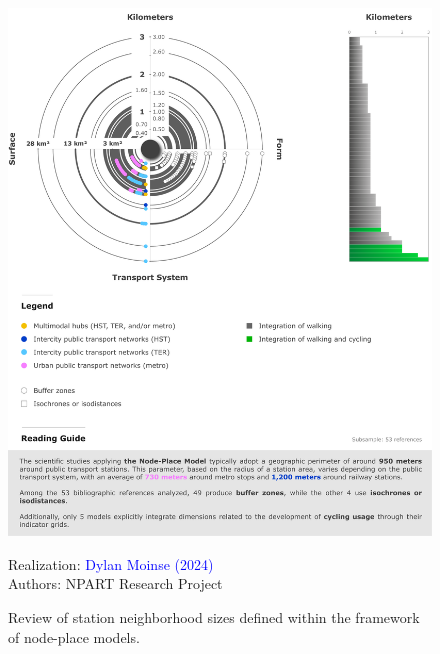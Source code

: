 \begin{refsegment}
\begin{figure}[h!]\vspace*{4pt}
    \caption{Review of station neighborhood sizes defined within the framework of node-place models.}
    \label{fig-chap6:revue-tailles-aires}
    \centerline{\includegraphics[width=1\columnwidth]{src/Figures/Chap-6/EN_NPART_Distances_quartiers_gare.pdf}}
    \vspace{5pt}
    \begin{flushright}\scriptsize{
    Realization: \textcolor{blue}{Dylan Moinse (2024)}
    \\
    Authors: \acrshort{NPART} Research Project
    }\end{flushright}
\end{figure}


\end{refsegment}
